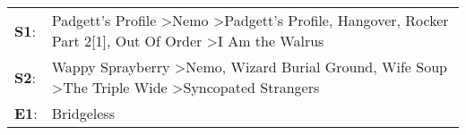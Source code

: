 \begin{supertabular}{p{0.03\textwidth}p{0.92\textwidth}}
 \textbf{S1}:  &  Padgett's Profile\textsuperscript{} \textgreater \enspace Nemo\textsuperscript{} \textgreater \enspace Padgett's Profile\textsuperscript{}, \enspace Hangover\textsuperscript{}, \enspace Rocker Part 2[1]\textsuperscript{}, \enspace Out Of Order\textsuperscript{} \textgreater \enspace I Am the Walrus\textsuperscript{}  \enspace  \\
 \textbf{S2}:  &                                    Wappy Sprayberry\textsuperscript{} \textgreater \enspace Nemo\textsuperscript{}, \enspace Wizard Burial Ground\textsuperscript{}, \enspace Wife Soup\textsuperscript{} \textgreater \enspace The Triple Wide\textsuperscript{} \textgreater \enspace Syncopated Strangers\textsuperscript{}  \enspace  \\
 \textbf{E1}:  &                                                                                                                                                                                                                                                                                                   Bridgeless\textsuperscript{}  \enspace  \\
\end{supertabular}
